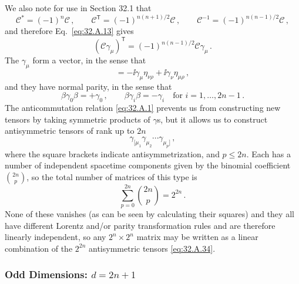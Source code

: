 We also note for use in Section 32.1 that
\begin{equation}
  \mathcal C^*=(-1)^n\mathcal C\,,
  \qquad
  \mathcal C^{\mathsf T}=(-1)^{n(n+1)/2}\mathcal C\,,
  \qquad
  \mathcal C^{-1}=(-1)^{n(n-1)/2}\mathcal C\,,
  \tag{32.A.30}\label{eq:32.A.30}
\end{equation}
and therefore Eq.~\eqref{eq:32.A.13} gives
\begin{equation}
  (\mathcal C\gamma_\mu)^{\mathsf T}
  =(-1)^{n(n-1)/2}\mathcal C\gamma_\mu\,.
  \tag{32.A.31}\label{eq:32.A.31}
\end{equation}
The \(\gamma_\mu\) form a vector, in the sense that
\begin{equation}
  [\mathcal J_{\mu\nu},\gamma_\rho]
  =-\ii\gamma_\mu\eta_{\nu\rho}
   +\ii\gamma_\nu\eta_{\mu\rho}\,,
  \tag{32.A.32}\label{eq:32.A.32}
\end{equation}
and they have normal parity, in the sense that
\begin{equation}
  \beta\gamma_0\beta=+\gamma_0\,,
  \qquad
  \beta\gamma_i\beta=-\gamma_i
  \quad\text{for \(i=1,\ldots,2n-1\)}\,.
  \tag{32.A.33}\label{eq:32.A.33}
\end{equation}
The anticommutation relation \eqref{eq:32.A.1} prevents us from constructing
new tensors by taking symmetric products of \(\gamma\)s, but it allows us
to construct antisymmetric tensors of rank up to \(2n\)
\begin{equation}
  \gamma_{[\mu_1}\gamma_{\mu_2}\cdots\gamma_{\mu_p]}\,,
  \tag{32.A.34}\label{eq:32.A.34}
\end{equation}
where the square brackets indicate antisymmetrization, and \(p\le 2n\).
Each has a number of independent spacetime components given by the binomial
coefficient \(\binom{2n}{p}\), so the total number of matrices of this type
is
\begin{equation}
  \sum_{p=0}^{2n}\binom{2n}{p}=2^{2n}\,.
  \tag{32.A.35}\label{eq:32.A.35}
\end{equation}
None of these vanishes (as can be seen by calculating their squares) and
they all have different Lorentz and/or parity transformation rules and are
therefore linearly independent, so any \(2^n\times2^n\) matrix may be written
as a linear combination of the \(2^{2n}\) antisymmetric tensors
\eqref{eq:32.A.34}.

\subsubsection*{Odd Dimensions: \(d=2n+1\)}

